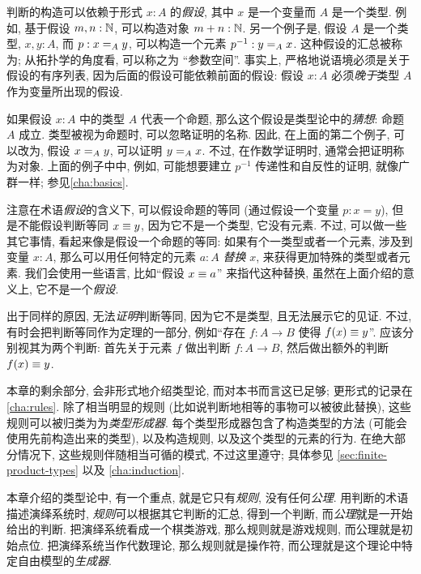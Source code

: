 %
判断的构造可以依赖于形式 $x:A$ 的\emph{假设}, 其中 $x$ 是一个变量而 $A$ 是一个类型.
例如, 基于假设 $m,n : \nat$, 可以构造对象 $m + n : \nat$.
另一个例子是, 假设 $A$ 是一个类型, $x,y : A$, 而  $p : \id[A]{x}{y}$, 可以构造一个元素 $p^{-1} : \id[A]{y}{x}$.
这种假设的汇总被称为;
从拓扑学的角度看, 可以称之为 ``参数空间''.
事实上, 严格地说语境必须是关于假设的有序列表, 因为后面的假设可能依赖前面的假设: 假设 $x:A$ 必须\emph{晚于}类型 $A$ 作为变量所出现的假设.

如果假设 $x:A$ 中的类型 $A$ 代表一个命题, 那么这个假设是类型论中的\emph{猜想}:
%
命题 $A$ 成立.
类型被视为命题时, 可以忽略证明的名称.
因此, 在上面的第二个例子, 可以改为, 假设 $\id[A]{x}{y}$, 可以证明 $\id[A]{y}{x}$.
不过, 在作数学证明时,
%
通常会把证明称为对象.
上面的例子中中, 例如, 可能想要建立 $p^{-1}$ 传递性和自反性的证明, 就像广群一样;
参见\cref{cha:basics}.

注意在术语\emph{假设}的含义下, 可以假设命题的等同 (通过假设一个变量 $p:x=y$), 但是不能假设判断等同 $x\jdeq y$, 因为它不是一个类型, 它没有元素.
不过, 可以做一些其它事情, 看起来像是假设一个命题的等同: 如果有个一类型或者一个元素, 涉及到变量 $x:A$, 那么可以用任何特定的元素 $a:A$ \emph{替换} $x$, 来获得更加特殊的类型或者元素.
我们会使用一些语言, 比如``假设 $x\jdeq a$'' 来指代这种替换, 虽然在上面介绍的意义上, 它不是一个\emph{假设}.
%
%

出于同样的原因, 无法\emph{证明}判断等同, 因为它不是类型, 且无法展示它的见证.
不过, 有时会把判断等同作为定理的一部分, 例如``存在 $f:A\to B$ 使得 $f(x)\jdeq y$''.
应该分别视其为两个判断: 首先关于元素 $f$ 做出判断  $f:A\to B$, 然后做出额外的判断 $f(x)\jdeq y$.

本章的剩余部分, 会非形式地介绍类型论, 而对本书而言这已足够;
更形式的记录在\cref{cha:rules}.
除了相当明显的规则 (比如说判断地相等的事物可以被彼此替换), 这些规则可以被归类为为\emph{类型形成器}.
每个类型形成器包含了构造类型的方法 (可能会使用先前构造出来的类型), 以及构造规则, 以及这个类型的元素的行为.
在绝大部分情况下, 这些规则伴随相当可循的模式, 不过这里遵守;
具体参见 \cref{sec:finite-product-types} 以及 \cref{cha:induction}.
%

%
%
本章介绍的类型论中, 有一个重点, 就是它只有\emph{规则}, 没有任何\emph{公理}.
用判断的术语描述演绎系统时, \emph{规则}可以根据其它判断的汇总, 得到一个判断, 而\emph{公理}就是一开始给出的判断.
把演绎系统看成一个棋类游戏, 那么规则就是游戏规则, 而公理就是初始点位.
把演绎系统当作代数理论, 那么规则就是操作符, 而公理就是这个理论中特定自由模型的\emph{生成器}.

